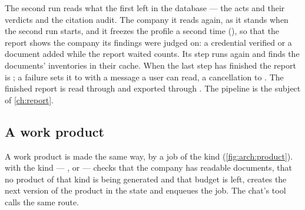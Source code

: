 The second run reads what the first left in the database --- the acts and their verdicts and
the citation audit. The company it reads again, as it stands when the second run starts, and
it freezes the profile a second time (), so that the report shows the
company its findings were judged on: a credential verified or a document added while the
report waited counts. Its  step
runs again and finds the documents' inventories in their cache. When the last step has finished the report is ; a failure sets it
to  with a message a user can read, a cancellation to . The
finished report is read through  and exported through
. The pipeline is the subject of \cref{ch:report}.

\subsection{A work product}

A work product is made the same way, by a job of the kind 
(\cref{fig:arch:product}).  with the kind ---
,  or  --- checks that the company has readable
documents, that no product of that kind is being generated and that budget is left, creates
the next version of the product in the state  and enqueues the job. The chat's
tool  calls the same route.

